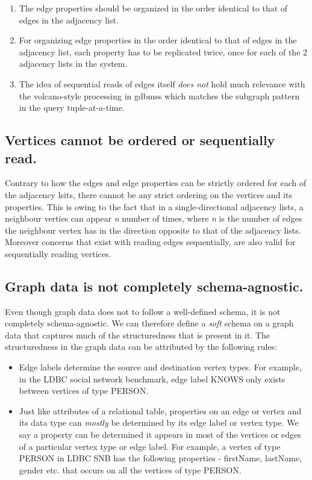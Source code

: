 \begin{enumerate}
	
	\item The edge properties should be organized in the order identical to that of edges in the adjacency list.
	
	\item For organizing edge properties in the order identical to that of edges in the adjacency list, each property has to be replicated twice, once for each of the 2 adjacency lists in the system.
	
	\item The idea of sequential reads of edges itself \emph{does not} hold much relevance with the volcano-style processing in \gls{gdbms}s which matches the subgraph pattern in the query tuple-at-a-time.

\end{enumerate}

\subsection{Vertices cannot be ordered or sequentially read.}

Contrary to how the edges and edge properties can be strictly ordered for each of the adjacency lsits, there cannot be any strict ordering on the vertices and its properties. This is owing to the fact that in a single-directional adjacency lists, a neighbour verties can appear \textit{n} number of times, where \textit{n} is the number of edges the neighbour vertex has in the direction opposite to that of the adjacency lists. Moreover concerns that exist with reading edges sequentially, are also valid for sequentially reading vertices.

\subsection{Graph data is not completely schema-agnostic.}

Even though graph data does not to follow a well-defined schema, it is not completely schema-agnostic. We can therefore define a \emph{soft} schema on a graph data that captures much of the structuredness that is present in it. The structuredness in the graph data can be attributed by the following rules:
\begin{itemize}
	
	\item Edge labels determine the source and destination vertex types. For example, in the LDBC social network benchmark, edge label KNOWS only exists between vertices of type PERSON.
	\item Just like attributes of a relational table, properties on an edge or vertex and its data type can \emph{mostly} be determined by its edge label or vertex type. We say a property can be determined it appears in most of the vertices or edges of a particular vertex type or edge label. For example, a vertex of type PERSON in LDBC SNB has the following properties - firstName, lastName, gender etc. that occurs on all the vertices of type PERSON.

\end{itemize}

